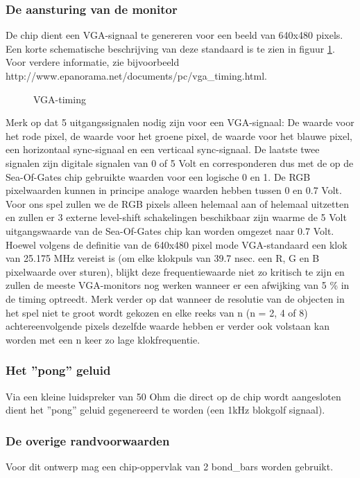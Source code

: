 \subsubsection{De aansturing van de monitor}
De chip dient een VGA-signaal te genereren voor een beeld van 640x480 pixels.
Een korte schemati\-sche beschrijving van deze standaard is te zien in
figuur \ref{vgatiming}.
Voor verdere informatie,
zie bijvoorbeeld http://www.epanorama.net/documents/pc/vga\_timing.html.
\begin{figure}[th]
\centerline{}
\caption{VGA-timing}
\label{vgatiming}
\end{figure}
Merk op dat 5 uitgangssignalen nodig zijn voor een VGA-signaal: De waarde voor het rode pixel,
de waarde voor het groene pixel, de waarde voor het blauwe pixel, een horizontaal sync-signaal
en een verticaal sync-signaal.  De laatste twee signalen zijn digitale signalen van 0 of 5 Volt en
corresponderen dus met de op de Sea-Of-Gates chip gebruikte waarden voor een logische 0 en 1.
De RGB pixelwaarden kunnen in principe analoge waarden hebben tussen 0 en 0.7 Volt.
Voor ons spel zullen we de RGB pixels alleen helemaal aan of helemaal uitzetten
en zullen er 3 externe
level-shift schakelingen beschikbaar zijn waarme
de 5 Volt uitgangswaarde van de Sea-Of-Gates chip
kan worden omgezet naar 0.7 Volt.
Hoewel volgens de definitie van de 640x480 pixel mode VGA-standaard een klok van 25.175
MHz vereist is (om elke klokpuls van 39.7 nsec. een R, G en B pixelwaarde over sturen), blijkt
deze frequentiewaarde niet zo kritisch te zijn en zullen de meeste VGA-monitors nog werken
wanneer er een afwijking van 5 \% in de timing optreedt.
Merk verder op dat wanneer de resolutie
van de objecten in het spel niet te groot wordt gekozen en elke reeks van n (n  = 2, 4 of 8)
achtereenvolgende pixels dezelfde waarde hebben er verder ook volstaan kan worden met een n
keer zo lage klokfrequentie.
\FloatBarrier

\subsubsection{Het ''pong'' geluid}
Via een kleine luidspreker van 50 Ohm die direct op de chip wordt
aangesloten dient het ''pong'' geluid gegenereerd te worden
(een 1kHz blokgolf signaal).

\subsubsection{De overige randvoorwaarden}
Voor dit ontwerp mag een chip-oppervlak van 2 bond\_bars worden gebruikt.

